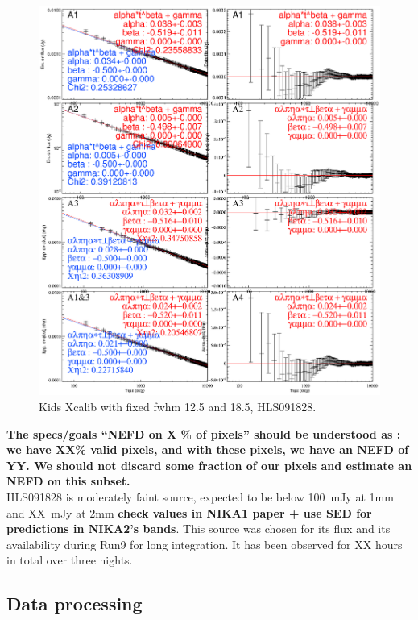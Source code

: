 \documentclass[a4paper, 11pt]{article} %
\begin{document}
\begin{figure}
\begin{center}
\includegraphics[clip, angle=0, scale = 0.5]{Figures/nefd_mpfit_HLS091828.eps}
\caption{Kids Xcalib with fixed fwhm 12.5 and 18.5, HLS091828.}
\label{fig:nefd_vs_t}
\end{center}
\end{figure}

{\bf The specs/goals ``NEFD on X \% of pixels'' should be understood as : we have
XX\% valid pixels, and with these pixels, we have an NEFD of YY. We should not
discard some fraction of our pixels and estimate an NEFD on this subset.}\\

HLS091828 is moderately faint source, expected to be below 100~mJy at 1mm and
XX~mJy at 2mm {\bf check values in NIKA1 paper + use SED for predictions in
  NIKA2's bands}. This source was chosen for its flux and its availability during
Run9 for long integration. It has been observed for XX hours in total over three
nights.

\subsection{Data processing}
\end{document}
